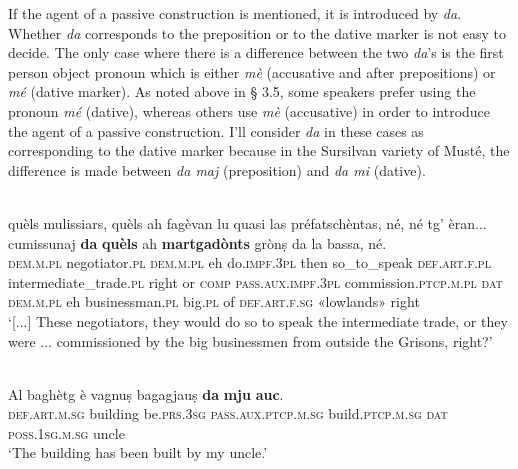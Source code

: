 If the agent of a passive construction is mentioned, it is introduced by \textit{da}. Whether \textit{da} corresponds to the preposition or to the dative marker is not easy to decide. The only case where there is a difference between the two \textit{da}'s is the first person object pronoun which is either \textit{mè} (accusative and after prepositions) or \textit{mé} (dative marker). As noted above in § 3.5, some speakers prefer using the pronoun \textit{mé} (dative), whereas others use \textit{mè} (accusative) in order to introduce the agent of a passive construction. I'll consider \textit{da} in these cases as corresponding to the dative marker because in the Sursilvan variety of Musté, the difference is made between \textit{da maj} (preposition) and \textit{da mi} (dative).

\ea
\label{}
\\
\gll [...] quèls mulissiars, quèls ah fagèvan lu quasi las préfatschèntas, né, né tg’ èran... cumissunaj \textbf{da} \textbf{quèls} ah \textbf{martgadònts} grònṣ da la bassa, né.\\
{} \textsc{dem.m.pl} negotiator.\textsc{pl} \textsc{dem.m.pl} eh do.\textsc{impf.3pl} then so\_to\_speak \textsc{def.art.f.pl}  intermediate\_trade.\textsc{pl} right or \textsc{comp} \textsc{pass.aux.impf.3pl} commission.\textsc{ptcp.m.pl} \textsc{dat} \textsc{dem.m.pl} eh businessman.\textsc{pl} big.\textsc{pl} of \textsc{def.art.f.sg} «lowlands» right \\
\glt `[...] These negotiators, they would do so to speak the intermediate trade, or they were ... commissioned by the big businessmen from outside the Grisons, right?'
\z

\ea
\label{}
\\
\gll Al baghètg è vagnuṣ bagagjauṣ \textbf{da} \textbf{mju} \textbf{auc}.\\
\textsc{def.art.m.sg} building be.\textsc{prs.3sg} \textsc{pass.aux.ptcp.m.sg} build.\textsc{ptcp.m.sg} \textsc{dat} \textsc{poss.1sg.m.sg} uncle\\
\glt `The building has been built by my uncle.'
\z